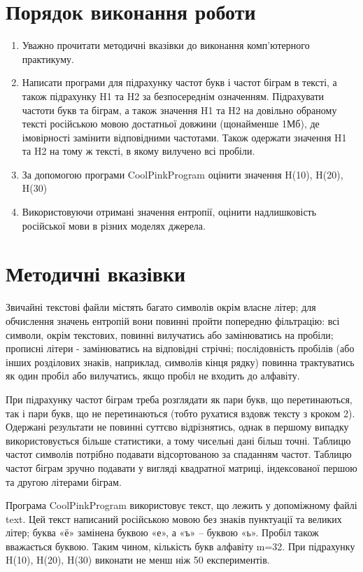 \documentclass{article}
\begin{document}
 
 \newpage
 \large
 \section{Порядок виконання роботи}
\begin{enumerate}
	\item Уважно прочитати методичні вказівки до виконання комп’ютерного практикуму.
	\item Написати програми для підрахунку частот букв і частот біграм в тексті, а також підрахунку H1 та H2 за безпосереднім означенням. Підрахувати частоти букв та біграм, а також значення H1 та H2 на довільно обраному тексті російською мовою достатньої довжини (щонайменше 1Мб), де імовірності замінити відповідними частотами. Також одержати значення H1 та H2 на тому ж тексті, в якому вилучено всі пробіли.
	\item За допомогою програми CoolPinkProgram оцінити значення H(10), H(20), H(30) 
	\item Використовуючи отримані значення ентропії, оцінити надлишковість російської
	мови в різних моделях джерела.
\end{enumerate}

\section{Методичні вказівки}
Звичайні текстові файли містять багато символів окрім власне літер; для обчислення значень ентропій вони повинні пройти попередню фільтрацію: всі символи, окрім текстових, повинні вилучатись або замінюватись на пробіли; прописні літери - замінюватись на відповідні стрічні; послідовність пробілів (або інших розділових знаків, наприклад, символів кінця рядку) повинна трактуватись як один пробіл або вилучатись, якщо пробіл не входить до алфавіту.


При підрахунку частот біграм треба розглядати як пари букв, що перетинаються, так і пари букв, що не перетинаються (тобто рухатися вздовж тексту з кроком 2). Одержані результати не повинні суттєво відрізнятись, однак в першому випадку використовується більше статистики, а тому чисельні дані більш точні. Таблицю частот символів потрібно подавати відсортованою за спаданням частот. Таблицю частот біграм зручно подавати у вигляді квадратної матриці, індексованої першою та другою літерами біграм.
	
	
Програма CoolPinkProgram використовує текст, що лежить у допоміжному файлі text. Цей текст написаний російською мовою без знаків пунктуації та великих літер; буква «ё» замінена буквою «е», а «ъ» – буквою «ь». Пробіл також вважається буквою. Таким чином, кількість букв алфавіту m=32. При підрахунку H(10), H(20), H(30) виконати не менш ніж 50 експериментів.
\end{document}
